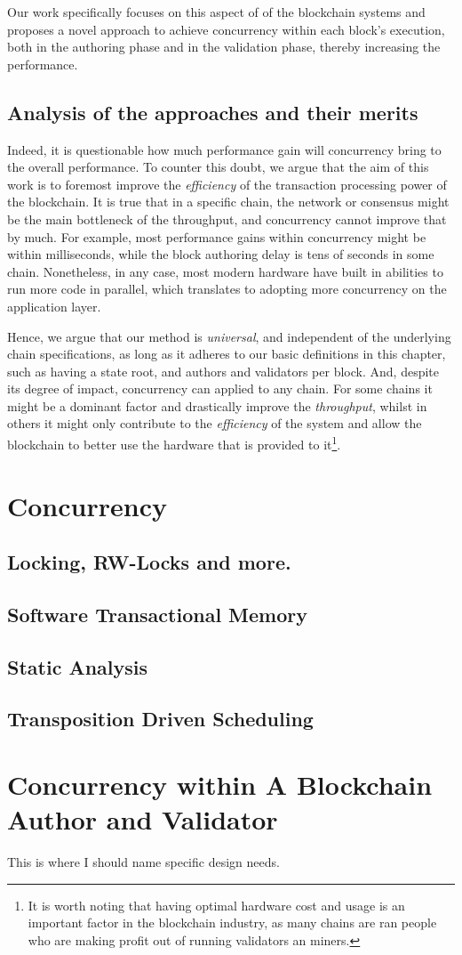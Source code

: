 Our work specifically focuses on this aspect of of the blockchain systems and proposes a novel
approach to achieve concurrency within each block's execution, both in the authoring phase and in
the validation phase, thereby increasing the performance.

\subsection{Analysis of the approaches and their merits} \label{chap_bg:subsec:summary_speedup}

Indeed, it is questionable how much performance gain will concurrency bring to the overall
performance. To counter this doubt, we argue that the aim of this work is to foremost improve the
\textit{efficiency} of the transaction processing power of the blockchain. It is true that in a specific
chain, the network or consensus might be the main bottleneck of the throughput, and concurrency
cannot improve that by much. For example, most performance gains within concurrency might be within
milliseconds, while the block authoring delay is tens of seconds in some chain. Nonetheless, in any
case, most modern hardware have built in abilities to run more code in parallel, which translates to
adopting more concurrency on the application layer.

Hence, we argue that our method is \textit{universal}, and independent of the underlying chain
specifications, as long as it adheres to our basic definitions in this chapter, such as having a
state root, and authors and validators per block. And, despite its degree of impact, concurrency can
applied to any chain. For some chains it might be a dominant factor and drastically improve the
\textit{throughput}, whilst in others it might only contribute to the \textit{efficiency} of the
system and allow the blockchain to better use the hardware that is provided to it\footnote{It is
worth noting that having optimal hardware cost and usage is an important factor in the blockchain
industry, as many chains are ran people who are making profit out of running validators an miners.}.


\section{Concurrency} \label{chap_bg:sec:concurrency}

\subsection{Locking, RW-Locks and more.}
\subsection{Software Transactional Memory}
\subsection{Static Analysis}
\subsection{Transposition Driven Scheduling}

\section{Concurrency within A Blockchain Author and Validator}
This is where I should name specific design needs.
